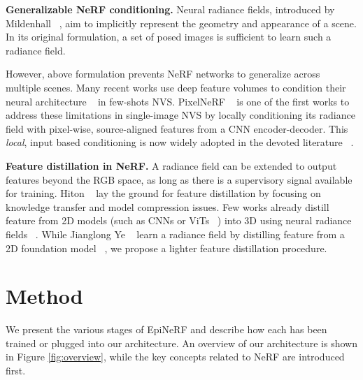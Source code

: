 \noindent\textbf{Generalizable NeRF conditioning.} Neural radiance fields, introduced by Mildenhall \etal ~\cite{mildenhall2020nerf}, aim to implicitly represent the geometry and appearance of a scene. In its original formulation, a set of posed images is sufficient to learn such a radiance field.

However, above formulation prevents NeRF networks to generalize across multiple scenes. Many recent works use deep feature volumes to condition their neural architecture ~\cite{wang2021ibrnet,chen2023matchnerf} in few-shots NVS. PixelNeRF ~\cite{yu2021pixelnerf} is one of the first works to address these limitations in single-image NVS by locally conditioning its radiance field with pixel-wise, source-aligned features from a CNN encoder-decoder. This \textit{local}, input based conditioning is now widely adopted in the devoted literature ~\cite{jang2021codenerf,li2022symmnerf,lin2023vision}.

\noindent\textbf{Feature distillation in NeRF.} A radiance field can be extended to output features beyond the RGB space, as long as there is a supervisory signal available for training. Hiton \etal ~\cite{hinton2015distilling} lay the ground for feature distillation by focusing on knowledge transfer and model compression issues. Few works already distill feature from 2D models (such as CNNs or ViTs ~\cite{dosovitskiy2020vit}) into 3D using neural radiance fields ~\cite{kobayashi2022decomposing}. While Jianglong Ye \etal ~\cite{ye2023featurenerf} learn a radiance field  by distilling feature from a 2D foundation model ~\cite{oquab2023dinov2}, we propose a lighter feature distillation procedure. 


\section{Method}
We present the various stages of EpiNeRF and describe how each has been trained or plugged into our architecture. An overview of our architecture is shown in Figure \ref{fig:overview}, while the key concepts related to NeRF are introduced first.

